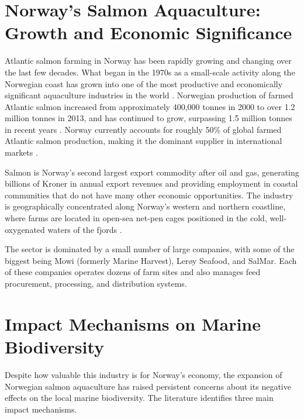 \documentclass[12pt, a4paper]{report}
\begin{document}
\section{Norway's Salmon Aquaculture: Growth and Economic Significance}

Atlantic salmon farming in Norway has been rapidly growing and changing over the last few decades. What began in the 1970s as a small-scale activity along the Norwegian coast has grown into one of the most productive and economically significant aquaculture industries in the world \citep{mfat2024}. Norwegian production of farmed Atlantic salmon increased from approximately 400,000 tonnes in 2000 to over 1.2 million tonnes in 2013, and has continued to grow, surpassing 1.5 million tonnes in recent years \citep{fiskeridir2024}. Norway currently accounts for roughly 50\% of global farmed Atlantic salmon production, making it the dominant supplier
in international markets \citep{ytrestoeyl2015}.

Salmon is Norway's second largest export commodity after oil and
gas, generating billions of Kroner in annual export revenues and providing
employment in coastal communities that do not have many other economic
opportunities. The industry is geographically concentrated along Norway's
western and northern coastline, where farms are located in open-sea net-pen cages positioned in the cold, well-oxygenated waters of the fjords
\citep{fiskeridir2024}.

The sector is dominated by a small number of large companies, with some of the biggest being Mowi (formerly Marine Harvest), Lerøy Seafood, and SalMar. Each of these companies operates dozens of farm sites and also manages feed procurement, processing, and distribution systems. 

\section{Impact Mechanisms on Marine Biodiversity}

Despite how valuable this industry is for Norway's economy, the expansion of Norwegian salmon aquaculture has raised persistent concerns about its negative effects on the local marine biodiversity. The literature identifies three main impact mechanisms.
\end{document}

